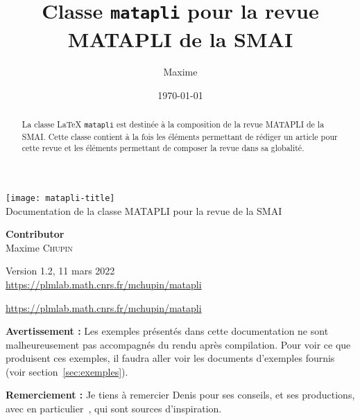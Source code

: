 \documentclass{mataplidoc}
\title{Classe \Verb+matapli+ pour la revue MATAPLI de la SMAI}
\author{Maxime \bsc{Chupin} \email{chupin@ceremade.dauphine.fr}}
\date{\today}
\begin{document}
\thispagestyle{empty}
%

\noindent
\texttt{[image: matapli-title]}\\
{\large Documentation de la classe MATAPLI pour la revue de la SMAI}\\[1cm]
\vspace{2cm}

\hfill\parbox{0.3\textwidth}{\Large\raggedleft
  \textbf{Contributor}\\
  Maxime \textsc{Chupin}
}
\vfill
\begin{center}
  Version 1.2, 11 mars 2022 \\
  \url{https://plmlab.math.cnrs.fr/mchupin/matapli}
\end{center}
\newpage

\maketitle

\begin{abstract}
  La classe \LaTeX{} \Verb+matapli+ est destinée à la composition de la revue
  MATAPLI de la SMAI. Cette classe  contient à la fois les éléments
  permettant de rédiger un article pour cette revue et les éléments
  permettant de composer la revue dans sa globalité.
\end{abstract}

\begin{center}
  \url{https://plmlab.math.cnrs.fr/mchupin/matapli}
\end{center}


\tableofcontents
\bigskip

\noindent\textbf{Avertissement :} Les exemples présentés dans cette
documentation ne sont malheureusement pas accompagnés du rendu après
compilation. Pour voir ce que produisent ces exemples, il faudra aller
voir les documents d'exemples fournis (voir section~\ref{sec:exemples}).

\noindent\textbf{Remerciement :} Je tiens à remercier Denis  pour
ses conseils, et ses productions, avec en particulier~\cite{gazette,yathesis},
qui sont sources d'inspiration.
\end{document}
